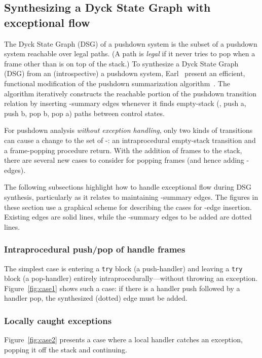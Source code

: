 \subsection{Synthesizing a Dyck State Graph with exceptional flow} \label{subsec: dcg-exn}

The Dyck State Graph (DSG) of a pushdown system is the subset of a pushdown system
reachable over legal paths.
(A path is \emph{legal} if it never tries to pop  when a frame other than  is on top of the stack.)
To synthesize a Dyck State Graph (DSG) from an 
(introspective) a pushdown system, 
Earl~\etal{} present an efficient, functional modification of the pushdown summarization algorithm~\cite{Earl:2012:IPDCFA}.
The algorithm iteratively constructs the reachable portion of the pushdown
transition relation by inserting -summary edges whenever it finds empty-stack 
(\eg, push a, push b, pop b, pop a)
paths between control states.

For pushdown analysis  \emph{without exception handling}, only two kinds of transitions
can cause a change to the set of -:
an intraprocedural empty-stack transition
and a frame-popping procedure return.
With the addition of  frames to the stack, 
there are several new cases to consider for popping frames (and hence adding -edges).

The following subsections highlight how to
handle exceptional flow during DSG synthesis, particularly as it relates
to maintaining -summary edges.
The figures in these section use a graphical scheme
for describing the cases for -edge insertion.
Existing edges are solid lines, while the -summary edges 
to be added
are dotted lines.


\subsubsection{Intraprocedural push/pop of handle frames}


The simplest case is entering a {\tt try} block (a \textsf{push-handler}) 
and leaving a {\tt try} block (a \textsf{pop-handler}) entirely 
intraprocedurally---without throwing an exception.
Figure~\ref{fig:case1} shows such a case: if there is a handler push followed by a handler pop, 
the synthesized (dotted) edge must be added.



\subsubsection{Locally caught exceptions}
Figure~\ref{fig:case2} presents a case where 
a local handler catches an exception, popping it off the stack
and continuing.




